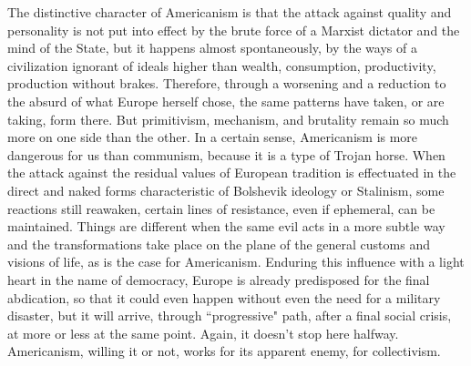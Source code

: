 The distinctive character of Americanism is that the attack against quality and personality is not put into effect by the brute force of a Marxist dictator and the mind of the State, but it happens almost spontaneously, by the ways of a civilization ignorant of ideals higher than wealth, consumption, productivity, production without brakes. Therefore, through a worsening and a reduction to the absurd of what Europe herself chose, the same patterns have taken, or are taking, form there. But primitivism, mechanism, and brutality remain so much more on one side than the other. In a certain sense, Americanism is more dangerous for us than communism, because it is a type of Trojan horse. When the attack against the residual values of European tradition is effectuated in the direct and naked forms characteristic of Bolshevik ideology or Stalinism, some reactions still reawaken, certain lines of resistance, even if ephemeral, can be maintained. Things are different when the same evil acts in a more subtle way and the transformations take place on the plane of the general customs and visions of life, as is the case for Americanism. Enduring this influence with a light heart in the name of democracy, Europe is already predisposed for the final abdication, so that it could even happen without even the need for a military disaster, but it will arrive, through ``progressive" path, after a final social crisis, at more or less at the same point. Again, it doesn't stop here halfway. Americanism, willing it or not, works for its apparent enemy, for collectivism.


